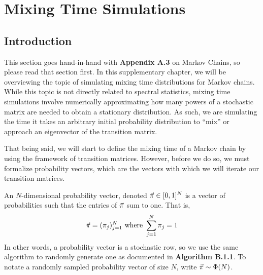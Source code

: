 \chapter{Mixing Time Simulations}
\section{Introduction}

This section goes hand-in-hand with \textbf{Appendix A.3} on Markov Chains, so please read that section first.
In this supplementary chapter, we will be overviewing the topic of simulating mixing time distributions for Markov chains.
While this topic is not directly related to spectral statistics,
mixing time simulations involve numerically approximating how many powers of a stochastic matrix are needed to obtain a stationary distribution.
As such, we are simulating the time it takes an arbitrary initial probability distribution to ``mix'' or approach an eigenvector of the transition matrix.
%

That being said, we will start to define the mixing time of a Markov chain by using the framework of transition matrices.
However, before we do so, we must formalize probability vectors, which are the vectors with which we will iterate our transition matrices.


\begin{definition}
An $N$-dimensional probability vector, denoted $\vec{\pi} \in [0,1]^N$ is a vector of probabilities such that the entries of $\vec{\pi}$ sum to one. That is,
$$\vec{\pi} = (\pi_j)_{j = 1}^N \text{ where } \sum_{j = 1}^N \pi_j = 1$$
In other words, a probability vector is a stochastic row, so we use the same algorithm to randomly generate one as documented in \textbf{Algorithm B.1.1}.
To notate a randomly sampled probability vector of size $N$, write $\vec{\pi} \sim \Phi(N)$.

\end{definition}


